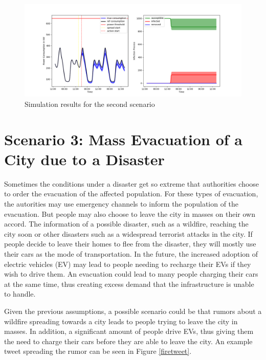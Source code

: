 \begin{figure}[!ht]
    \center
    \includegraphics[scale=.55]{figs/eval/scenario2/basicplot.png}
    \caption{Simulation results for the second scenario}
    \label{schwurblerresults}
\end{figure}

\section{Scenario 3: Mass Evacuation of a City due to a Disaster}

Sometimes the conditions under a disaster get so extreme that 
authorities choose to order the evacuation of the affected population.
For these types of evacuation, the autorities may use emergency channels 
to inform the population of the evacuation.
But people may also choose to leave the city in masses on their own accord.
The information of a possible disaster, such as a wildfire, reaching the
city soon or other disasters such as a widespread terrorist attacks 
in the city.
If people decide to leave their homes to flee from the disaster, they 
will mostly use their cars as the mode of transportation.
In the future, the increased adoption of electric vehicles (EV)
may lead to people needing to recharge their EVs if they wish 
to drive them. An evacuation could lead to many people charging
their cars at the same time, thus creating excess demand that 
the infrastructure is unable to handle. 

Given the previous assumptions, a possible scenario could be that 
rumors about a wildfire spreading towards a city leads to people
trying to leave the city in masses. In addition, a significant 
amount of people drive EVs, thus giving them the need to charge
their cars before they are able to leave the city. An example
tweet spreading the rumor can be seen in Figure \ref{firetweet}.



